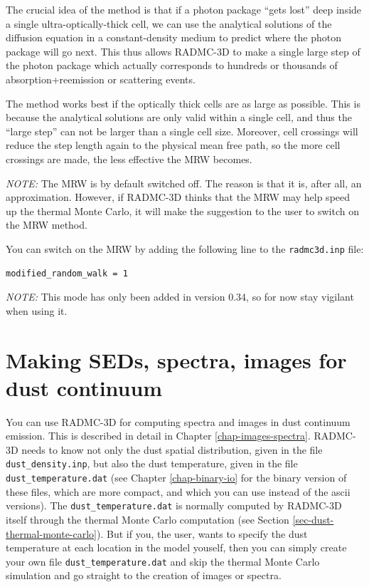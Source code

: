 \documentclass{report}
\begin{document}
The crucial idea of the method is that if a photon package ``gets lost''
deep inside a single ultra-optically-thick cell, we can use the analytical
solutions of the diffusion equation in a constant-density medium to predict
where the photon package will go next. This thus allows RADMC-3D to make a
single large step of the photon package which actually corresponds to
hundreds or thousands of absorption+reemission or scattering events.

The method works best if the optically thick cells are as large as possible.
This is because the analytical solutions are only valid within a single
cell, and thus the ``large step'' can not be larger than a single cell size.
Moreover, cell crossings will reduce the step length again to the physical
mean free path, so the more cell crossings are made, the less effective the
MRW becomes. 

{\em NOTE:} The MRW is by default switched off. The reason is that it is,
after all, an approximation. However, if RADMC-3D thinks that the MRW may
help speed up the thermal Monte Carlo, it will make the suggestion to the
user to switch on the MRW method. 

You can switch on the MRW by adding the following line to the
{\small\tt radmc3d.inp} file:
{\small\begin{verbatim}
modified_random_walk = 1
\end{verbatim}}

{\em NOTE:} This mode has only been added in version 0.34, so for now
stay vigilant when using it.



\section{Making SEDs, spectra, images for dust continuum}
\label{sec-dust-ray-tracing}
%
You can use RADMC-3D for computing spectra and images in dust continuum
emission. This is described in detail in Chapter
\ref{chap-images-spectra}. RADMC-3D needs to know not only the dust spatial
distribution, given in the file {\small\tt dust\_density.inp}, but also the
dust temperature, given in the file {\small\tt dust\_temperature.dat} (see
Chapter \ref{chap-binary-io} for the binary version of these files, which
are more compact, and which you can use instead of the ascii versions). The
{\small\tt dust\_temperature.dat} is normally computed by RADMC-3D itself
through the thermal Monte Carlo computation (see Section
\ref{sec-dust-thermal-monte-carlo}). But if you, the user, wants to specify
the dust temperature at each location in the model youself, then you can
simply create your own file {\small\tt dust\_temperature.dat} and skip the
thermal Monte Carlo simulation and go straight to the creation of images or
spectra.
\end{document}
